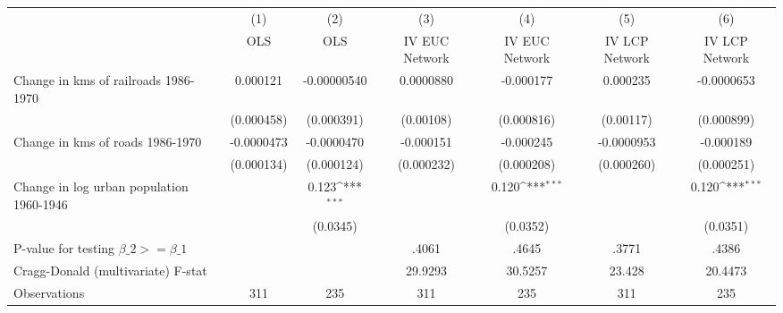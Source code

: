 {
\def\sym#1{\ifmmode^{#1}\else\(^{#1}\)\fi}
\begin{tabular}{l*{6}{c}}
\hline\hline
                &\multicolumn{1}{c}{(1)}&\multicolumn{1}{c}{(2)}&\multicolumn{1}{c}{(3)}&\multicolumn{1}{c}{(4)}&\multicolumn{1}{c}{(5)}&\multicolumn{1}{c}{(6)}\\
                &\multicolumn{1}{c}{OLS}&\multicolumn{1}{c}{OLS}&\multicolumn{1}{c}{IV EUC Network}&\multicolumn{1}{c}{IV EUC Network}&\multicolumn{1}{c}{IV LCP Network}&\multicolumn{1}{c}{IV LCP Network}\\
\hline
Change in kms of railroads 1986-1970& 0.000121         &-0.00000540         &0.0000880         &-0.000177         & 0.000235         &-0.0000653         \\
                &(0.000458)         &(0.000391)         &(0.00108)         &(0.000816)         &(0.00117)         &(0.000899)         \\
[1em]
Change in kms of roads 1986-1970&-0.0000473         &-0.0000470         &-0.000151         &-0.000245         &-0.0000953         &-0.000189         \\
                &(0.000134)         &(0.000124)         &(0.000232)         &(0.000208)         &(0.000260)         &(0.000251)         \\
[1em]
Change in log urban population 1960-1946&                  &    0.123\sym{***}&                  &    0.120\sym{***}&                  &    0.120\sym{***}\\
                &                  & (0.0345)         &                  & (0.0352)         &                  & (0.0351)         \\
\hline
P-value for testing $\beta\_{2} >= \beta\_{1}$&                  &                  &    .4061         &    .4645         &    .3771         &    .4386         \\
Cragg-Donald (multivariate) F-stat&                  &                  &  29.9293         &  30.5257         &   23.428         &  20.4473         \\
Observations    &      311         &      235         &      311         &      235         &      311         &      235         \\
\hline\hline
\end{tabular}
}
